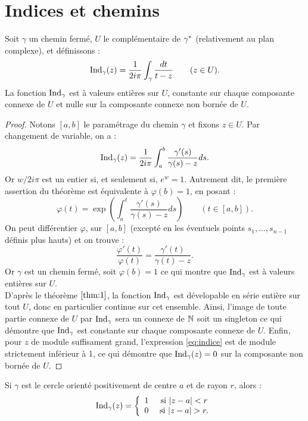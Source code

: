 \section{Indices et chemins}

\begin{thm}[Indice]
\label{thm:ind}
Soit $\gamma$ un chemin fermé, $U$ le complémentaire de $\gamma^{\ast}$ (relativement au plan complexe), et définissons :
\begin{equation}
\operatorname{Ind}_{\gamma}(z) = \dfrac1{2i\pi} \int_{\gamma} \dfrac{dt}{t-z} \qquad (z \in U) . \label{eq:indice}
\end{equation}
La fonction $\operatorname{Ind}_{\gamma}$ est à valeurs entières sur $U$, constante sur chaque composante connexe de $U$ et nulle
sur la composante connexe non bornée de $U$.
\end{thm}

\begin{proof}
Notons $[a,b]$ le paramétrage du chemin $\gamma$ et fixons $z \in U$. Par changement de variable, on a :
\[ \operatorname{Ind}_{\gamma}(z) = \dfrac1{2i\pi} \int_{a}^{b} \dfrac{\gamma'(s)}{\gamma(s)-z}ds . \]
Or $w / 2i\pi$ est un entier si, et seulement si, $e^w = 1$. 
Autrement dit, le première assertion du théorème est équivalente à $\varphi(b)=1$, en posant :
\[ \varphi(t) = \exp \left ( \int_a^t \dfrac{\gamma'(s)}{\gamma(s)-z}ds \right ) \qquad (t \in [a,b]) . \]
On peut différentier $\varphi$, sur $[a,b]$ (excepté en les éventuels points $s_1, \dots, s_{n-1}$ définis plus hauts) et on trouve :
\[ \dfrac{\varphi'(t)}{\varphi(t)} = \dfrac{\gamma'(t)}{\gamma(t)-z} . \]
Or $\gamma$ est un chemin fermé, soit $\varphi(b) = 1$ ce qui montre que $\operatorname{Ind}_{\gamma}$ est à valeurs entières sur $U$. \\

D'après le théorème $\ref{thm:1}$, la fonction $\operatorname{Ind}_{\gamma}$ est dévelopable en série entière sur tout $U$, donc
en particulier continue sur cet ensemble. Ainsi, l'image de toute partie connexe de $U$ par $\operatorname{Ind}_{\gamma}$ sera un connexe
de $\mathbb{N}$ soit un singleton ce qui démontre que $\operatorname{Ind}_{\gamma}$ est constante sur chaque composante connexe de $U$.
Enfin, pour $z$ de module suffisament grand, l'expression \ref{eq:indice} est de module strictement inférieur à 1, 
ce qui démontre que $\operatorname{Ind}_{\gamma}(z) = 0$ sur la composante non bornée de $U$.
\end{proof}

\begin{thm}
\label{ind:cercle}
Si $\gamma$ est le cercle orienté positivement de centre $a$ et de rayon $r$, alors :
\[ \operatorname{Ind}_{\gamma}(z) = \left \{ \begin{array}{c c} 1 & \text{  si  } \lvert z-a\rvert<r \\ 0 & \text{  si  } \lvert z-a\rvert>r . \end{array} \right. \]
\end{thm}

